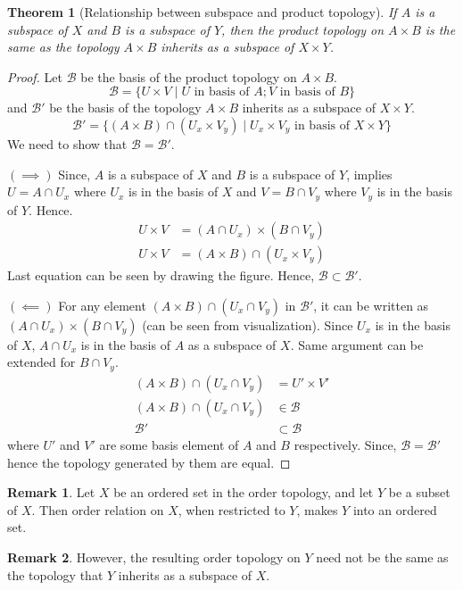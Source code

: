 \documentclass[12pt,reqno]{amsart}
\theoremstyle{plain}
\newtheorem{thm}{Theorem}
\theoremstyle{definition}
\newtheorem{rem}{Remark}
\newcommand{\cal}[1]{\mathcal{#1}}
\begin{document}
\begin{thm}[Relationship between subspace and product topology]
    If $A$ is a subspace of $X$ and $B$ is a subspace of $Y$, then the product topology on $A \times B$ is the same as the topology $A \times B$ inherits as a subspace of $X \times Y$.
\end{thm}
\begin{proof}
    Let $\cal B$ be the basis of the product topology on $A \times B$. 
    $$ \cal B = \{U \times V \mid U \text{ in basis of } A; V \text{ in basis of } B\} $$
    and $\cal B'$ be the basis of the topology $A \times B$ inherits as a subspace of $X \times Y$.
    $$ \cal B' = \{(A \times B)\cap (U_x \times V_y) \mid U_x \times V_y \text{ in basis of } X \times Y\} $$
    We need to show that $\cal B = \cal B'$. 
    
    \noindent $(\implies)$ Since, $A$ is a subspace of $X$ and $B$ is a subspace of $Y$, implies $U = A \cap U_x$ where $U_x$ is in the basis of $X$ and $V = B \cap V_y$ where $V_y$ is in the basis of $Y$. Hence. 
    \begin{align*}
        U \times V &= (A \cap U_x) \times (B \cap V_y)\\
        U \times V &= (A \times B) \cap (U_x \times V_y)        
    \end{align*}
    Last equation can be seen by drawing the figure. Hence, $\cal B \subset \cal B'$.

    \noindent $(\impliedby)$ For any element $(A \times B) \cap (U_x \cap V_y)$ in $\cal B'$, it can be written as $(A \cap U_x) \times (B \cap V_y)$ (can be seen from visualization). Since $U_x$ is in the basis of $X$, $A \cap U_x$ is in the basis of $A$ as a subspace of $X$. Same argument can be extended for $B \cap V_y$.
    \begin{align*}
        (A \times B) \cap (U_x \cap V_y) &= U' \times V'\\
        (A \times B) \cap (U_x \cap V_y) &\in \cal B\\
        \cal B' &\subset \cal B
    \end{align*}
    where $U'$ and $V'$ are  some basis element of $A$ and $B$ respectively. Since, $\cal B = \cal B'$ hence the topology generated by them are equal.
\end{proof}

\begin{rem}
    Let $X$ be an ordered set in the order topology, and let $Y$ be a subset of $X$. Then order relation on $X$, when restricted to $Y$, makes $Y$ into an ordered set.    
\end{rem}
\begin{rem}
    However, the resulting order topology on $Y$ need not be the same as the topology that $Y$ inherits as a subspace of $X$.
\end{rem}
\end{document}
